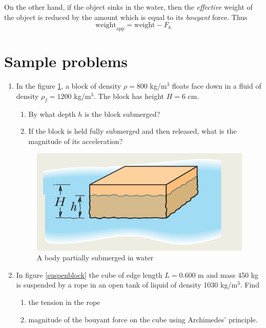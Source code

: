 \documentclass[10pt]{article}
\begin{document}
On the other hand, if the object sinks in the water, then the \emph{effective} weight of the object is reduced by the amount which is equal to its \emph{bouyant} force.  Thus
\begin{equation}
  \text{weight}_{\text{app}}=\text{weight} - F_b
\end{equation}

\section{Sample problems}
\begin{enumerate}
\item In the figure \ref{blockfloat}, a block of density $\rho = 800$ kg/$\text{m}^3$ floats face down in a fluid of density $\rho_f = 1200$ kg/$\text{m}^3$.  The block has height $H=6$ cm.
  \begin{enumerate}
  \item By what depth $h$ is the block submerged?
  \item If the block is held fully submerged and then released, what is the magnitude of its acceleration?
  \end{enumerate}
\begin{figure}[h]
\includegraphics[scale=.9]{partialfloat}
\centering
\caption{A body partially submerged in water}
\label{blockfloat}
\centering
\end{figure}
\vspace{300px}
\item In figure \ref{suspenblock} the cube of edge length $L=0.600$ m and mass 450 kg is suspended by a rope in an open tank of liquid of density 1030 kg/$\text{m}^3$.  Find 
  \begin{enumerate}
  \item the tension in the rope
  \item magnitude of the bouyant force on the cube using Archimedes' principle.
  \end{enumerate}

\end{enumerate}
\end{document}
